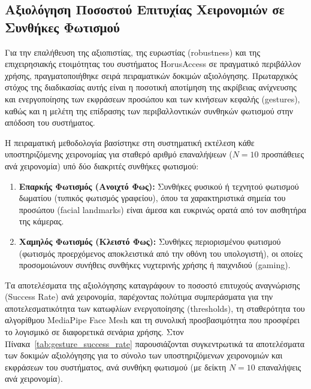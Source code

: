 \documentclass[twoside, a4paper, 11pt]{article}
\newcommand{\textlatin}[1]{\textenglish{#1}}
\begin{document}
\subsection{Αξιολόγηση Ποσοστού Επιτυχίας Χειρονομιών σε Συνθήκες Φωτισμού}

Για την επαλήθευση της αξιοπιστίας, της ευρωστίας (\textlatin{robustness}) και της επιχειρησιακής ετοιμότητας του συστήματος \textlatin{HorusAccess} σε πραγματικό περιβάλλον χρήσης, πραγματοποιήθηκε σειρά πειραματικών δοκιμών αξιολόγησης. Πρωταρχικός στόχος της διαδικασίας αυτής είναι η ποσοτική αποτίμηση της ακρίβειας ανίχνευσης και ενεργοποίησης των εκφράσεων προσώπου και των κινήσεων κεφαλής (\textlatin{gestures}), καθώς και η μελέτη της επίδρασης των περιβαλλοντικών συνθηκών φωτισμού στην απόδοση του συστήματος.

Η πειραματική μεθοδολογία βασίστηκε στη συστηματική εκτέλεση κάθε υποστηριζόμενης χειρονομίας για σταθερό αριθμό επαναλήψεων ($N = 10$ προσπάθειες ανά χειρονομία) υπό δύο διακριτές συνθήκες φωτισμού:
\begin{enumerate}
    \item \textbf{Επαρκής Φωτισμός (Ανοιχτό Φως):} Συνθήκες φυσικού ή τεχνητού φωτισμού δωματίου (τυπικός φωτισμός γραφείου), όπου τα χαρακτηριστικά σημεία του προσώπου (\textlatin{facial landmarks}) είναι άμεσα και ευκρινώς ορατά από τον αισθητήρα της κάμερας.
    \item \textbf{Χαμηλός Φωτισμός (Κλειστό Φως):} Συνθήκες περιορισμένου φωτισμού (φωτισμός προερχόμενος αποκλειστικά από την οθόνη του υπολογιστή), οι οποίες προσομοιώνουν συνήθεις συνθήκες νυχτερινής χρήσης ή παιχνιδιού (\textlatin{gaming}).
\end{enumerate}

Τα αποτελέσματα της αξιολόγησης καταγράφουν το ποσοστό επιτυχούς αναγνώρισης (\textlatin{Success Rate}) ανά χειρονομία, παρέχοντας πολύτιμα συμπεράσματα για την αποτελεσματικότητα των κατωφλίων ενεργοποίησης (\textlatin{thresholds}), τη σταθερότητα του αλγορίθμου \textlatin{MediaPipe Face Mesh} και τη συνολική προσβασιμότητα που προσφέρει το λογισμικό σε διαφορετικά σενάρια χρήσης.
Στον Πίνακα~\ref{tab:gesture_success_rate} παρουσιάζονται συγκεντρωτικά τα αποτελέσματα των δοκιμών αξιολόγησης για το σύνολο των υποστηριζόμενων χειρονομιών και εκφράσεων του συστήματος, ανά συνθήκη φωτισμού (με δείκτη $N = 10$ επαναλήψεις ανά χειρονομία).
\end{document}

